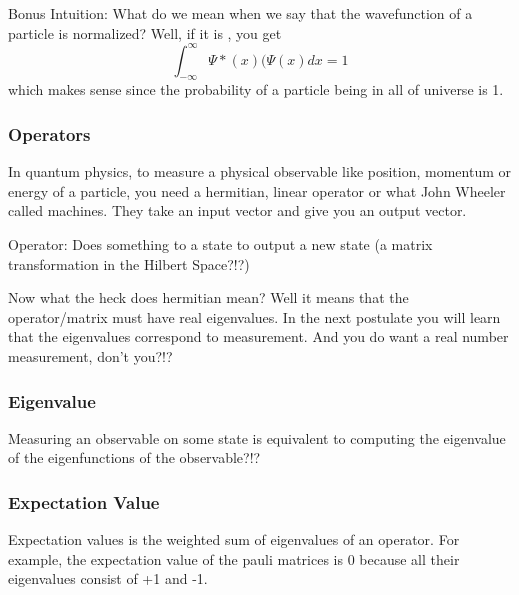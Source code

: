 \documentclass{article}
\begin{document}
Bonus Intuition: What do we mean when we say that the wavefunction of a
particle is normalized? Well, if it is , you get
\[\int_{-\infty}^{\infty}\Psi*(x)(\Psi(x) dx = 1 \]
which makes sense since the probability of a particle being in all of
universe is 1.

\subsubsection{Operators}
In quantum physics, to measure a physical observable like position, momentum
or energy of a particle, you need a hermitian, linear operator or what
John Wheeler called machines. They take an input vector and give you an output
vector.

Operator: Does something to a state to output a new state (a matrix
          transformation in the Hilbert Space?!?)

Now what the heck does hermitian mean? Well it means that the operator/matrix
must have real eigenvalues. In the next postulate you will learn that the
eigenvalues correspond to measurement. And you do want a real number measurement,
don't you?!?
\subsubsection{Eigenvalue}

Measuring an observable on some state is equivalent to computing the eigenvalue
of the eigenfunctions of the observable?!?

\subsubsection{Expectation Value}

Expectation values is the weighted sum of eigenvalues of an operator. For example,
the expectation value of the pauli matrices is 0 because all their eigenvalues
consist of +1 and -1.
\end{document}
